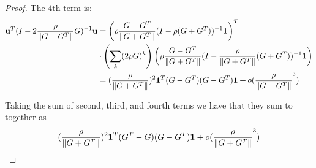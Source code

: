 \begin{proof}
    The 4th term is:
    \begin{align*}
        \mathbf{u}^T (I - 2\frac{\rho}{\|G+G^T\|} G)^{-1} \mathbf{u} &= \left( \rho \frac{G-G^T}{\|G+G^T\|} (I - \rho(G+G^T))^{-1} \mathbf{1}\right) ^T\\
        &\cdot \left(\sum_{k} (2\rho G)^k \right) \left( \rho \frac{G-G^T}{\|G+G^T\|} (I - \frac{\rho}{\|G+G^T\|}(G+G^T))^{-1} \mathbf{1} \right) \\
        &=   (\frac{\rho}{\|G+G^T\|})^2 \mathbf{1}^T (G-G^T) ( G-G^T) \mathbf{1} + o(\frac{\rho}{\|G+G^T\|}^3) 
    \end{align*}

    Taking the sum of second, third, and fourth terms we have that they sum to together as 
    \begin{equation}
        (\frac{\rho}{\|G+G^T\|})^2 \mathbf{1}^T (G^T-G)(G-G^T) \mathbf{1} + o(\frac{\rho}{\|G+G^T\|}^3) 
    \end{equation}
    

\end{proof} 
